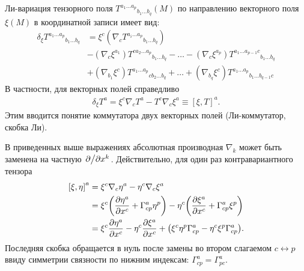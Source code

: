 \documentclass[12pt,a4paper]{article}
\begin{document}
        Ли-вариация тензорного поля ${T^{a_1 \dots a_p}}_{b_1 \dots b_q}(M)$ по направлению векторного поля $\xi(M)$ в координатной записи имеет вид:
        \begin{equation}\begin{aligned}
            \delta_\xi {T^{a_1 \dots a_p}}_{b_1 \dots b_q}
                &= \xi^c \left( \nabla_c {T^{a_i \dots a_p}}_{b_1 \dots b_q} \right) \\
                &- \left( \nabla_{c} \xi^{a_1} \right) {T^{c a_2 \dots a_p}}_{b_1 \dots b_q} - \dots
                 - \left( \nabla_{c} \xi^{a_p} \right) {T^{a_1 \dots a_{p-1} c}}_{b_1 \dots b_q} \\
                &+ \left( \nabla_{b_1} \xi^c \right) {T^{a_1 \dots a_p}}_{c b_2 \dots b_q} + \dots
                 + \left( \nabla_{b_q} \xi^c \right) {T^{a_1 \dots a_p}}_{b_1 \dots b_{q-1} c}
        \end{aligned}\end{equation}
        В частности, для векторных полей справедливо
        \begin{equation}\begin{aligned}\label{eq:vector_field_commutator}
            \delta_\xi T^a
                = \xi^c \nabla_c T^a - T^c \nabla_{c} \xi^a
                \equiv [\xi, T]^a.
        \end{aligned}\end{equation}
        Этим вводится понятие коммутатора двух векторных полей (Ли-коммутатор, скобка Ли).

        В приведенных выше выражениях абсолютная производная $\nabla_k$ может быть заменена на частную $\pdv*{x^k}$. Действительно, для один раз контравариантного тензора
        \begin{equation}\begin{aligned}
            \qty[\xi, \eta]^a
                &= \xi^c \nabla_c \eta^a - \eta^c \nabla_{c} \xi^a \\
                &= \xi^c \qty( \pdv{\eta^a}{x^c} + \Gamma_{cp}^a \eta^p )
                    - \eta^c \qty( \pdv{\xi^a}{x^c} + \Gamma_{cp}^a \xi^p ) \\
                &= \xi^c \pdv{\eta^a}{x^c} - \eta^c \pdv{\xi^a}{x^c}
                    + \qty( \xi^c \eta^p \Gamma_{cp}^a - \eta^c \xi^p \Gamma_{cp}^a ) .
        \end{aligned}\end{equation}
        Последняя скобка обращается в нуль после замены во втором слагаемом $c \leftrightarrow p$ ввиду симметрии связности по нижним индексам: $\Gamma_{cp}^a = \Gamma_{pc}^a$.
\end{document}
